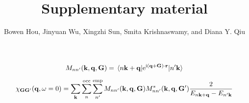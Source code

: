 \documentclass[hyperref, a4paper]{article}
\title{Supplementary material}
\author{Bowen Hou, Jinyuan Wu, Xingzhi Sun, Smita Krishnaswamy, and Diana Y. Qiu}
\newcommand*{\ii}{\mathrm{i}}
\newcommand*{\ee}{\mathrm{e}}
\begin{document}
\maketitle

\begin{equation}
    M_{nn'}(\vb{k}, \vb{q}, \vb{G}) = \mel*{n \vb{k} + \vb{q}}{\ee^{\ii (\vb{q} + \vb{G}) \cdot \vb{r}}}{n' \vb{k}}
\end{equation}

\begin{equation}
    \chi_{\vb{G} \vb{G}'}(\vb{q}, \omega = 0)
    = \sum_{\vb{k}} \sum_{n}^{\text{occ}} \sum_{n'}^{\text{emp}} 
    M_{n n'} (\vb{k}, \vb{q}, \vb{G}) M^*_{nn'} (\vb{k}, \vb{q}, \vb{G}') 
    \frac{
        2
    }{
        E_{n \vb{k} + \vb{q}} - E_{n' \vb{k}} 
    }
\end{equation}
\end{document}
